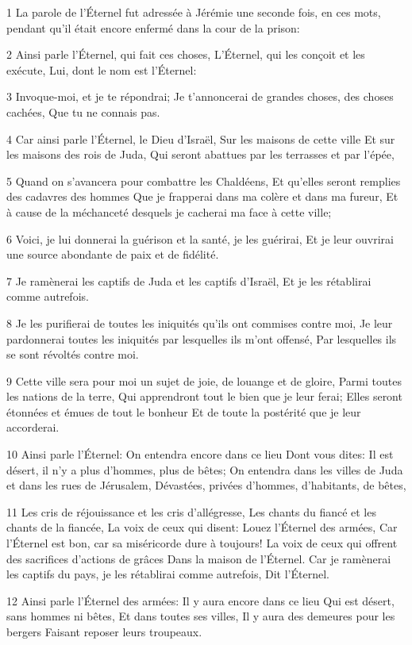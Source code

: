 \par 1 La parole de l'Éternel fut adressée à Jérémie une seconde fois, en ces mots, pendant qu'il était encore enfermé dans la cour de la prison:
\par 2 Ainsi parle l'Éternel, qui fait ces choses, L'Éternel, qui les conçoit et les exécute, Lui, dont le nom est l'Éternel:
\par 3 Invoque-moi, et je te répondrai; Je t'annoncerai de grandes choses, des choses cachées, Que tu ne connais pas.
\par 4 Car ainsi parle l'Éternel, le Dieu d'Israël, Sur les maisons de cette ville Et sur les maisons des rois de Juda, Qui seront abattues par les terrasses et par l'épée,
\par 5 Quand on s'avancera pour combattre les Chaldéens, Et qu'elles seront remplies des cadavres des hommes Que je frapperai dans ma colère et dans ma fureur, Et à cause de la méchanceté desquels je cacherai ma face à cette ville;
\par 6 Voici, je lui donnerai la guérison et la santé, je les guérirai, Et je leur ouvrirai une source abondante de paix et de fidélité.
\par 7 Je ramènerai les captifs de Juda et les captifs d'Israël, Et je les rétablirai comme autrefois.
\par 8 Je les purifierai de toutes les iniquités qu'ils ont commises contre moi, Je leur pardonnerai toutes les iniquités par lesquelles ils m'ont offensé, Par lesquelles ils se sont révoltés contre moi.
\par 9 Cette ville sera pour moi un sujet de joie, de louange et de gloire, Parmi toutes les nations de la terre, Qui apprendront tout le bien que je leur ferai; Elles seront étonnées et émues de tout le bonheur Et de toute la postérité que je leur accorderai.
\par 10 Ainsi parle l'Éternel: On entendra encore dans ce lieu Dont vous dites: Il est désert, il n'y a plus d'hommes, plus de bêtes; On entendra dans les villes de Juda et dans les rues de Jérusalem, Dévastées, privées d'hommes, d'habitants, de bêtes,
\par 11 Les cris de réjouissance et les cris d'allégresse, Les chants du fiancé et les chants de la fiancée, La voix de ceux qui disent: Louez l'Éternel des armées, Car l'Éternel est bon, car sa miséricorde dure à toujours! La voix de ceux qui offrent des sacrifices d'actions de grâces Dans la maison de l'Éternel. Car je ramènerai les captifs du pays, je les rétablirai comme autrefois, Dit l'Éternel.
\par 12 Ainsi parle l'Éternel des armées: Il y aura encore dans ce lieu Qui est désert, sans hommes ni bêtes, Et dans toutes ses villes, Il y aura des demeures pour les bergers Faisant reposer leurs troupeaux.
